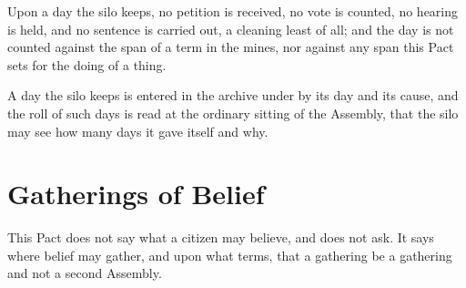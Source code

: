 \begin{clauses}
\item Upon a day the silo keeps, no petition is received, no vote is counted, no hearing is held, and no sentence is carried out, a cleaning least of all; and the day is not counted against the span of a term in the mines, nor against any span this Pact sets for the doing of a thing.
\item A day the silo keeps is entered in the archive under  by its day and its cause, and the roll of such days is read at the ordinary sitting of the Assembly, that the silo may see how many days it gave itself and why.
\end{clauses}

\section{Gatherings of Belief}
\label{sec:assembly:gatherings-of-belief}

This Pact does not say what a citizen may believe, and does not ask. It says where belief may gather, and upon what terms, that a gathering be a gathering and not a second Assembly.

